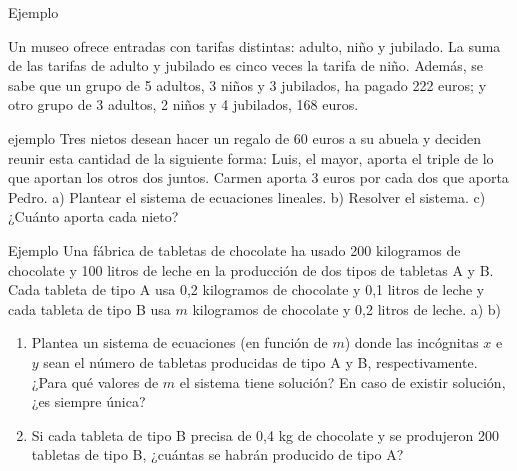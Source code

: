 \documentclass[9pt]{beamer}
\begin{document}
\begin{frame}
\begin{exampleblock}{Ejemplo}

Un museo ofrece entradas con tarifas distintas: adulto, niño y jubilado. La suma de las tarifas de adulto y jubilado es cinco veces la tarifa de niño. Además, se sabe que un grupo de 5 adultos, 3 niños y 3 jubilados, ha pagado 222 euros; y otro grupo de 3 adultos, 2 niños y 4 jubilados, 168 euros.
\end{exampleblock}
\end{frame}

\begin{frame}
\begin{exampleblock}{ejemplo}
Tres nietos desean hacer un regalo de 60 euros a su abuela y deciden reunir esta cantidad de la siguiente forma: Luis, el mayor, aporta el triple de lo que aportan los otros dos juntos. Carmen aporta 3 euros por cada dos que aporta Pedro.
a) Plantear el sistema de ecuaciones lineales.
b) Resolver el sistema.
c) ¿Cuánto aporta cada nieto?
\end{exampleblock}
\end{frame}

\begin{frame}
\begin{exampleblock}{Ejemplo}
Una fábrica de tabletas de chocolate ha usado 200 kilogramos de chocolate y 100 litros de leche en la producción de dos tipos de tabletas A y B. Cada tableta de tipo A usa 0,2 kilogramos de chocolate y 0,1 litros de leche y cada tableta de tipo B usa $m$ kilogramos de chocolate y 0,2 litros de leche.
a) 
b) 
\begin{enumerate}
\item Plantea un sistema de ecuaciones (en función de $m$) donde las incógnitas $x$ e $y$ sean el número de tabletas producidas de tipo A y B, respectivamente. ¿Para qué valores de $m$ el sistema tiene solución? En caso de existir solución, ¿es siempre única?
\item Si cada tableta de tipo B precisa de 0,4 kg de chocolate y se produjeron 200 tabletas de tipo B, ¿cuántas se habrán producido de tipo A?
\end{enumerate}

\end{exampleblock}
\end{frame}
\end{document}
